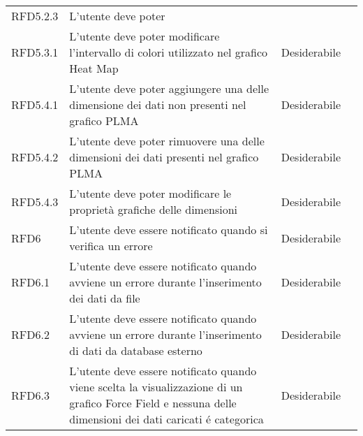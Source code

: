 \begin{longtable}[H]{|>{\raggedright\arraybackslash}p{20mm} | p{90mm} | p{22mm} | p{30mm} |}
    RFD5.2.3 
        & L'utente deve poter 
        & 
        & \\

    RFD5.3.1 
        & L'utente deve poter modificare l'intervallo di colori utilizzato nel grafico Heat Map
        & Desiderabile
        & \\

    RFD5.4.1
        & L'utente deve poter aggiungere una delle dimensione dei dati non presenti nel grafico PLMA
        & Desiderabile
        & \\
    
    RFD5.4.2
        & L'utente deve poter rimuovere una delle dimensioni dei dati presenti nel grafico PLMA
        & Desiderabile
        & \\

    RFD5.4.3
        & L'utente deve poter modificare le proprietà grafiche delle dimensioni
        & Desiderabile
        & \\

    RFD6
        & L'utente deve essere notificato quando si verifica un errore
        & Desiderabile
        & \\

    RFD6.1
        & L'utente deve essere notificato quando avviene un errore durante 
        l'inserimento dei dati da file
        & Desiderabile
        & \\

    RFD6.2
        & L'utente deve essere notificato quando avviene un errore durante 
        l'inserimento di dati da database esterno
        & Desiderabile
        & \\

    RFD6.3
        & L'utente deve essere notificato quando viene scelta la visualizzazione di un grafico Force Field e nessuna delle dimensioni dei dati caricati é categorica
        & Desiderabile
        & \\


\end{longtable}
